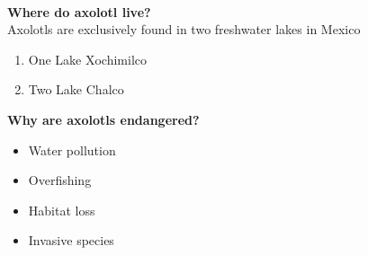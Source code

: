  \\

\textbf{Where do axolotl live?} \\
Axolotls are exclusively found in two freshwater lakes in Mexico 
\begin{enumerate}
    \item One Lake Xochimilco 
    \item Two Lake Chalco
\end{enumerate} 
\textbf{Why are axolotls endangered?}
\begin{itemize}
  \item Water pollution
  \item Overfishing
  \item Habitat loss
  \item Invasive species
\end{itemize}